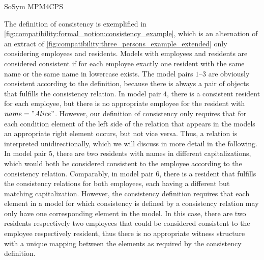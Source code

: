 \begin{copiedFrom}{SoSym MPM4CPS}
\begin{example}
The definition of consistency is exemplified in \autoref{fig:compatibility:formal_notion:consistency_example}, which is an alternation of an extract of \autoref{fig:compatibility:three_persons_example_extended} only considering employees and residents. Models with employees and residents are considered consistent if for each employee exactly one resident with the same name or the same name in lowercase exists.
The model pairs $1$--$3$ are obviously consistent according to the definition, because there is always a pair of objects that fulfills the consistency relation.
In model pair $4$, there is a consistent resident for each employee, but there is no appropriate employee for the resident with $name = "Alice"$. However, our definition of consistency only requires that for each condition element of the left side of the relation that appears in the models an appropriate right element occurs, but not vice versa. Thus, a relation is interpreted unidirectionally, which we will discuss in more detail in the following.
In model pair $5$, there are two residents with names in different capitalizations, which would both be considered consistent to the employee according to the consistency relation.
Comparably, in model pair $6$, there is a resident that fulfills the consistency relations for both employees, each having a different but matching capitalization. 
However, the consistency definition requires that each element in a model for which consistency is defined by a consistency relation may only have one corresponding element %
in the model. 
In this case, there are two residents respectively two employees that could be considered consistent to the employee respectively resident, thus there is no appropriate witness structure with a unique mapping between the elements as required by the consistency definition.
\end{example}



\end{copiedFrom}
